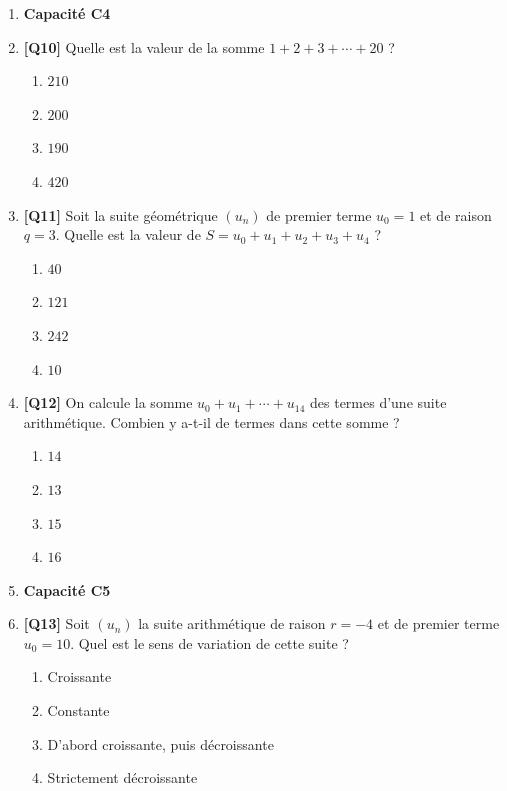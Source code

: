 \begin{enumerate}
\item[] \textbf{Capacité C4}

\item \textbf{[Q10]} Quelle est la valeur de la somme $1 + 2 + 3 + \cdots + 20$ ?
  \begin{enumerate}[label=\Alph*.]
    \item $210$
    \item $200$
    \item $190$
    \item $420$
  \end{enumerate}

\item \textbf{[Q11]} Soit la suite géométrique $(u_n)$ de premier terme $u_0 = 1$ et de raison $q = 3$. Quelle est la valeur de $S = u_0 + u_1 + u_2 + u_3 + u_4$ ?
  \begin{enumerate}[label=\Alph*.]
    \item $40$
    \item $121$
    \item $242$
    \item $10$
  \end{enumerate}

\item \textbf{[Q12]} On calcule la somme $u_0 + u_1 + \cdots + u_{14}$ des termes d'une suite arithmétique. Combien y a-t-il de termes dans cette somme ?
  \begin{enumerate}[label=\Alph*.]
    \item $14$
    \item $13$
    \item $15$
    \item $16$
  \end{enumerate}

\item[] \textbf{Capacité C5}

\item \textbf{[Q13]} Soit $(u_n)$ la suite arithmétique de raison $r = -4$ et de premier terme $u_0 = 10$. Quel est le sens de variation de cette suite ?
  \begin{enumerate}[label=\Alph*.]
    \item Croissante
    \item Constante
    \item D'abord croissante, puis décroissante
    \item Strictement décroissante
  \end{enumerate}


\end{enumerate}
